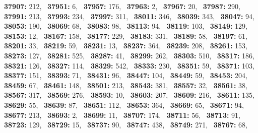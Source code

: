 \textbf{37907:} 212,\allowbreak~ 
\textbf{37951:} 6,\allowbreak~ 
\textbf{37957:} 176,\allowbreak~ 
\textbf{37963:} 2,\allowbreak~ 
\textbf{37967:} 20,\allowbreak~ 
\textbf{37987:} 290,\allowbreak~ 
\textbf{37991:} 213,\allowbreak~ 
\textbf{37993:} 234,\allowbreak~ 
\textbf{37997:} 311,\allowbreak~ 
\textbf{38011:} 346,\allowbreak~ 
\textbf{38039:} 343,\allowbreak~ 
\textbf{38047:} 94,\allowbreak~ 
\textbf{38053:} 190,\allowbreak~ 
\textbf{38069:} 68,\allowbreak~ 
\textbf{38083:} 98,\allowbreak~ 
\textbf{38113:} 94,\allowbreak~ 
\textbf{38119:} 103,\allowbreak~ 
\textbf{38149:} 129,\allowbreak~ 
\textbf{38153:} 12,\allowbreak~ 
\textbf{38167:} 158,\allowbreak~ 
\textbf{38177:} 229,\allowbreak~ 
\textbf{38183:} 331,\allowbreak~ 
\textbf{38189:} 58,\allowbreak~ 
\textbf{38197:} 61,\allowbreak~ 
\textbf{38201:} 33,\allowbreak~ 
\textbf{38219:} 59,\allowbreak~ 
\textbf{38231:} 13,\allowbreak~ 
\textbf{38237:} 364,\allowbreak~ 
\textbf{38239:} 208,\allowbreak~ 
\textbf{38261:} 153,\allowbreak~ 
\textbf{38273:} 127,\allowbreak~ 
\textbf{38281:} 525,\allowbreak~ 
\textbf{38287:} 41,\allowbreak~ 
\textbf{38299:} 262,\allowbreak~ 
\textbf{38303:} 510,\allowbreak~ 
\textbf{38317:} 186,\allowbreak~ 
\textbf{38321:} 126,\allowbreak~ 
\textbf{38327:} 114,\allowbreak~ 
\textbf{38329:} 542,\allowbreak~ 
\textbf{38333:} 230,\allowbreak~ 
\textbf{38351:} 59,\allowbreak~ 
\textbf{38371:} 103,\allowbreak~ 
\textbf{38377:} 151,\allowbreak~ 
\textbf{38393:} 71,\allowbreak~ 
\textbf{38431:} 96,\allowbreak~ 
\textbf{38447:} 104,\allowbreak~ 
\textbf{38449:} 59,\allowbreak~ 
\textbf{38453:} 204,\allowbreak~ 
\textbf{38459:} 67,\allowbreak~ 
\textbf{38461:} 148,\allowbreak~ 
\textbf{38501:} 213,\allowbreak~ 
\textbf{38543:} 381,\allowbreak~ 
\textbf{38557:} 32,\allowbreak~ 
\textbf{38561:} 38,\allowbreak~ 
\textbf{38567:} 317,\allowbreak~ 
\textbf{38569:} 276,\allowbreak~ 
\textbf{38593:} 10,\allowbreak~ 
\textbf{38603:} 207,\allowbreak~ 
\textbf{38609:} 216,\allowbreak~ 
\textbf{38611:} 135,\allowbreak~ 
\textbf{38629:} 55,\allowbreak~ 
\textbf{38639:} 87,\allowbreak~ 
\textbf{38651:} 112,\allowbreak~ 
\textbf{38653:} 364,\allowbreak~ 
\textbf{38669:} 65,\allowbreak~ 
\textbf{38671:} 94,\allowbreak~ 
\textbf{38677:} 213,\allowbreak~ 
\textbf{38693:} 2,\allowbreak~ 
\textbf{38699:} 11,\allowbreak~ 
\textbf{38707:} 174,\allowbreak~ 
\textbf{38711:} 56,\allowbreak~ 
\textbf{38713:} 91,\allowbreak~ 
\textbf{38723:} 129,\allowbreak~ 
\textbf{38729:} 15,\allowbreak~ 
\textbf{38737:} 90,\allowbreak~ 
\textbf{38747:} 438,\allowbreak~ 
\textbf{38749:} 271,\allowbreak~ 
\textbf{38767:} 68,\allowbreak~ 
